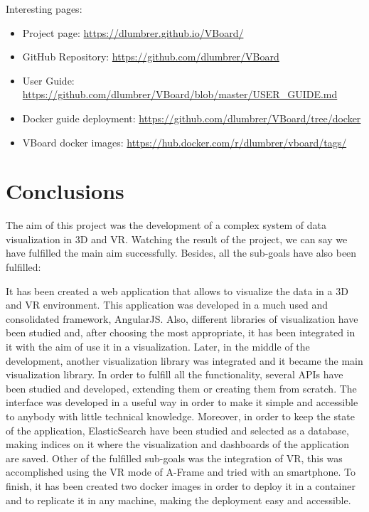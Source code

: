 \documentclass[a4paper, 12pt]{book}
\begin{document}
Interesting pages:

\begin{itemize}
\item Project page: \url{https://dlumbrer.github.io/VBoard/}
\item GitHub Repository: \url{https://github.com/dlumbrer/VBoard}
\item User Guide: \url{https://github.com/dlumbrer/VBoard/blob/master/USER_GUIDE.md}
\item Docker guide deployment: \url{https://github.com/dlumbrer/VBoard/tree/docker}
\item VBoard docker images: \url{https://hub.docker.com/r/dlumbrer/vboard/tags/}
\end{itemize}


\cleardoublepage
\chapter{Conclusions}
\label{chap:conclusions}
The aim of this project was the development of a complex system of data visualization in 3D and VR. Watching the result of the project, we can say we have fulfilled the main aim successfully. Besides, all the sub-goals have also been fulfilled:

It has been created a web application that allows to visualize the data in a 3D and VR environment. This application was developed in a much used and consolidated framework, AngularJS. Also, different libraries of visualization have been studied and, after choosing the most appropriate, it has been integrated in it with the aim of use it in a visualization. Later, in the middle of the development, another visualization library was integrated and it became the main visualization library. In order to fulfill all the functionality, several APIs have been studied and developed, extending them or creating them from scratch. The interface was developed in a useful way in order to make it simple and accessible to anybody with little technical knowledge. Moreover, in order to keep the state of the application, ElasticSearch have been studied and selected as a database, making indices on it where the visualization and dashboards of the application are saved. Other of the fulfilled sub-goals was the integration of VR, this was accomplished using the VR mode of A-Frame and tried with an smartphone. To finish, it has been created two docker images in order to deploy it in a container and to replicate it in any machine, making the deployment easy and accessible.\\
\end{document}
